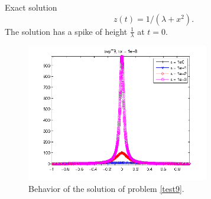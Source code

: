 \documentclass[<options>]{article}
\begin{document}
\textrm{Exact solution}
$$z(t) = 1 / (\lambda + x^{2}).$$
The solution has a spike of height $\frac{1}{\lambda}$ at $t = 0.$

\begin{figure}[htb]
\centerline{\includegraphics[height=6cm]{Prob9}}
\caption{Behavior of the solution of problem \ref{test9}.}
\end{figure}
\newpage
\end{document}
